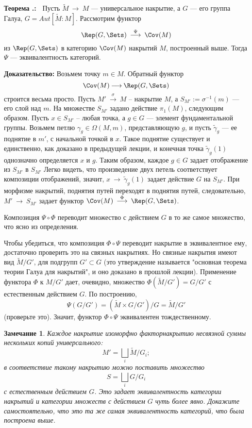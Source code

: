 \documentclass[12pt]{book}
\newcommand{\arrow}{{\:\longrightarrow\:}}
\def\endproof{\hbox{\vrule width 5pt height 5pt depth 0pt}}
\theoremstyle{upshape}
\newtheorem{zadacha}{Задача}[chapter]
\theoremstyle{generic}
\newtheorem{remark}[teorema]{Замечание}
\def\замечание{\begin{remark}}
\def\еза{\end{remark}}
\theoremstyle{upshapenonumber}
\newcommand{\следствие}{%
     \refstepcounter{teorema}
     {\noindent\bf Следствие \thechapter.\arabic{teorema}:\ }}
\newcommand{\пример}{%
     \refstepcounter{teorema}
     {\noindent\bf Пример \thechapter.\arabic{teorema}:\ }}
\newcommand{\лемма}{%
     \refstepcounter{teorema}
     {\noindent\bf Лемма \thechapter.\arabic{teorema}:\ }}
\newcommand{\теорема}{%
     \refstepcounter{teorema}
     {\noindent\bf Теорема \thechapter.\arabic{teorema}:\ }}
\newcommand{\утверждение}{%
     \refstepcounter{teorema}
     {\noindent\bf Утверждение \thechapter.\arabic{teorema}:\ }}
\def\хфилл{\hfill}
\def\ноиндент{\noindent}
\def\бф{\bf}
\def\ем{\em}
\def\задача{\begin{zadacha}}
\def\ез{\end{zadacha}}
\def\еу{\end{ukazanie}}
\def\ео{\end{opredelenie}}
\def\енум{\begin{enumerate}}
\def\ее{\end{enumerate}}
\begin{document}
\теорема\label{_mnozh_w_dejstv_nakry_Teorema_}
Пусть $\tilde M \arrow M$ --- универсальное
накрытие, а $G$ --- его группа Галуа, 
$G=Aut[\tilde M: M]$. Рассмотрим функтор 
 \[ \Rep(G, \Sets)\stackrel \Psi\arrow \Cov(M)\]
из $\Rep(G, \Sets)$ в категорию $\Cov(M)$ накрытий $M$,
построенный выше. Тогда $\Psi$ --- эквивалентность категорий.

\хфилл

\ноиндент
{\бф Доказательство:} Возьмем точку $m \in M$.
Обратный функтор \[ \Cov(M)\arrow \Rep(G, \Sets)\] строится
весьма просто. Пусть $M' \stackrel \sigma \arrow M$ --
накрытие $M$, а $S_{M'}:=\sigma^{-1}(m)$ --- его
слой над $m$. На множестве $S_{M'}$ задано действие
$\pi_1(M)$, следующим образом. Пусть $x \in S_{M'}$ --
любая точка, а $g\in G$ --- элемент фундаментальной группы.
Возьмем петлю $\gamma_g\in \Omega(M,m)$, представляющую
$g$, и пусть $\tilde \gamma_g$ --- ее поднятие в $m'$,
с начальной точкой в $x$. Такое поднятие существует
и единственно, как доказано в предыдущей лекции,
и конечная точка $\tilde \gamma_g(1)$ однозначно
определяется $x$ и $g$. Таким образом, каждое
$g\in G$ задает отображение из $S_{M'}$ в $S_{M'}$ 
Легко видеть, что произведение двух петель соответствует
композиции отображений, значит, $x \arrow \tilde \gamma_g(1)$ 
задает действие $G$ на $S_{M'}$. При морфизме накрытий,
поднятия путей переходят в поднятия путей, следовательно,
$M' \arrow S_{M'}$ задает функтор  
$\Cov(M)\stackrel \Phi\arrow \Rep(G,\Sets)$.

Композиция $\Psi \circ\Phi$ переводит множество
с действием $G$ в то же самое множество, что ясно из определения.

Чтобы убедиться, что композиция $\Phi \circ\Psi$ переводит накрытие
в эквивалентное ему, достаточно проверить это на связных
накрытиях. Но связные накрытия имеют вид $\tilde M/G'$,
для подгрупп $G'\subset G$ (это утверждение называется
"основная теорема теории Галуа для накрытий", и оно
доказано в прошлой лекции). Применение
функтора $\Phi$ к $M/G'$ дает, очевидно, множество
$\Phi(\tilde M/G')=G/G'$ с естественным действием $G$.
По построению,
\[ 
  \Psi(G/G') = (\tilde M \times G/G')/G= \tilde M/G'
\]
(проверьте это). Значит, функтор $\Phi \circ\Psi$ эквивалентен
тождественному. \endproof


\замечание
Каждое накрытие изоморфно факторнакрытию несвязной
суммы нескольких копий универсального:
\[
M' = \bigsqcup_i \tilde M/G_i;
\]
в соответствие такому накрытию можно поставить
множество
\[
S = \bigsqcup_i G/G_i
\]
с естественным действием $G$. Это задает эквивалентность
категории накрытий и категории множеств с действием $G$ чуть более
явно. Докажите самостоятельно, что это та же самая
эквивалентность категорий, что была построена выше.
\еза
\end{document}
